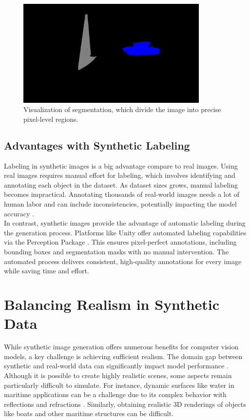 \begin{figure}[H]
    \centering
    \includegraphics[width=0.85\textwidth]{Figures/segmentation_2.png}
    \caption{Visualization of segmentation, which divide the image into precise pixel-level regions.}
    \label{fig:image3}
\end{figure}



\subsection{Advantages with Synthetic Labeling}
Labeling in synthetic images is a big advantage compare to real images. Using real images requires manual effort for labeling, which involves identifying and annotating each object in the dataset. As dataset sizes grows, manual labeling becomes impractical. Annotating thousands of real-world images needs a lot of human labor and can include inconsistencies, potentially impacting the model accuracy \cite{nikolenko2021synthetic}.\\

\noindent In contrast, synthetic images provide the advantage of automatic labeling during the generation process. Platforms like Unity offer automated labeling capabilities via the Perception Package \cite{unity-perception2022}. This ensures pixel-perfect annotations, including bounding boxes and segmentation masks with no manual intervention. The automated process delivers consistent, high-quality annotations for every image while saving time and effort.


\section{Balancing Realism in Synthetic Data}
While synthetic image generation offers numerous benefits for computer vision models, a key challenge is achieving sufficient realism. The domain gap between synthetic and real-world data can significantly impact model performance \cite{nikolenko2021synthetic}.  Although it is possible to create highly realistic scenes, some aspects remain particularly difficult to simulate. For instance, dynamic surfaces like water in maritime applications can be a challenge due to its complex behavior with reflections and refractions \cite{waterrendering}. Similarly, obtaining realistic 3D renderings of objects like boats and other maritime structures can be difficult.\\

